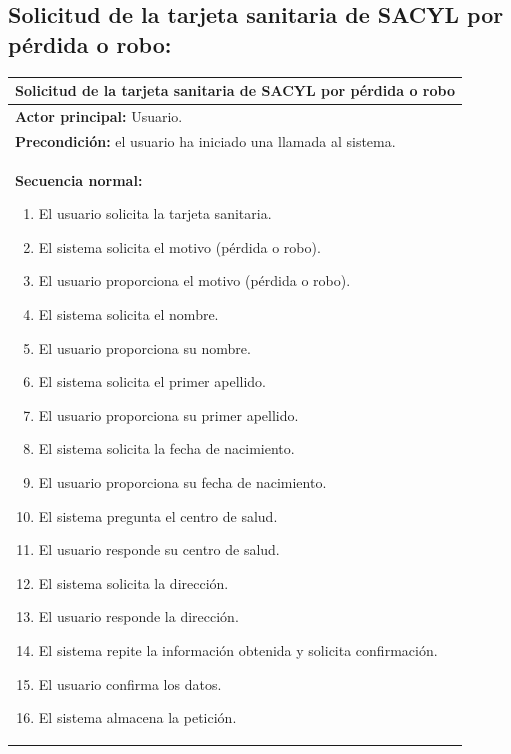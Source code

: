 \documentclass[12pt, a4paper, twoside]{report}
\begin{document}
        \subsection{Solicitud de la tarjeta sanitaria de SACYL por pérdida o robo:}
            \begin{table}[H]
            \centering
            \begin{tabular}{|p{16cm}|} 
            \hline
            \textbf{Solicitud de la tarjeta sanitaria de SACYL por pérdida o robo} \\ \hline
            \textbf{Actor principal:} Usuario. \\ \hline
            \textbf{Precondición:} el usuario ha iniciado una llamada al sistema. \\ \hline
            \textbf{Secuencia normal:} 
                \begin{enumerate}
                    \item El usuario solicita la tarjeta sanitaria.
                    \item El sistema solicita el motivo (pérdida o robo).
                    \item El usuario proporciona el motivo (pérdida o robo).
                    \item El sistema solicita el nombre.
                    \item El usuario proporciona su nombre.
                    \item El sistema solicita el primer apellido.
                    \item El usuario proporciona su primer apellido.
                    \item El sistema solicita la fecha de nacimiento.
                    \item El usuario proporciona su fecha de nacimiento.
                    \item El sistema pregunta el centro de salud.
                    \item El usuario responde su centro de salud.
                    \item El sistema solicita la dirección.
                    \item El usuario responde la dirección.
                    \item El sistema repite la información obtenida y solicita confirmación. 
                    \item El usuario confirma los datos.
                    \item El sistema almacena la petición.

\end{enumerate}
\end{tabular}
\end{table}
\end{document}
